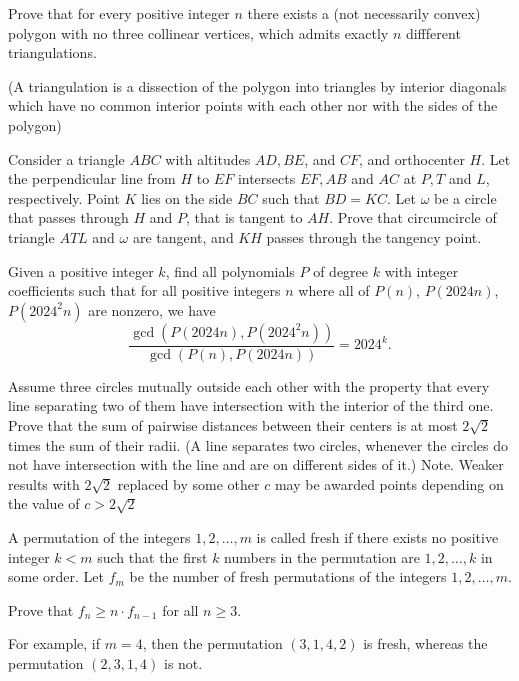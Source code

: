 \documentclass[11pt]{scrartcl}
\begin{document}
\begin{problem}[3706706337726127226]
Prove that for every positive integer $n$ there exists a (not necessarily convex) polygon with no three collinear vertices, which admits exactly $n$ diffferent triangulations.

(A triangulation is a dissection of the polygon into triangles by interior diagonals which have no common interior points with each other nor with the sides of the polygon)
\end{problem}
\begin{problem}[263704170707884]
	Consider a triangle $ABC$ with altitudes $AD, BE$, and $CF$, and orthocenter $H$. Let the perpendicular line from $H$ to $EF$ intersects $EF, AB$ and $AC$ at $P, T$ and $L$, respectively. Point $K$ lies on the side $BC$ such that $BD=KC$. Let $\omega$ be a circle that passes through $H$ and $P$, that is tangent to $AH$. Prove that circumcircle of triangle $ATL$ and $\omega$ are tangent, and $KH$ passes through the tangency point.
\end{problem}
\begin{problem}[291724488494808]
Given a positive integer $k$, find all polynomials $P$ of degree $k$ with integer coefficients such that for all positive integers $n$ where all of $P(n)$, $P(2024n)$, $P(2024^2n)$ are nonzero, we have
$$\frac{\gcd(P(2024n), P(2024^2n))}{\gcd(P(n), P(2024n))}=2024^k.$$
\end{problem}
\begin{problem}[725882523060129]
Assume three circles mutually outside each other with the property that every line separating two of them have intersection with the interior of the third one. Prove that the sum of pairwise distances between their centers is at most $2\sqrt{2}$ times the sum of their radii.
(A line separates two circles, whenever the circles do not have intersection with the line and are on different sides of it.)
Note. Weaker results with $2\sqrt{2}$ replaced by some other $c$ may be awarded points depending on the value of $c>2\sqrt{2}$
\end{problem}
\begin{problem}[742398043567245501]
	A permutation of the integers $1, 2, \ldots, m$ is called fresh if there exists no positive integer $k < m$ such that the first $k$ numbers in the permutation are $1, 2, \ldots, k$ in some order. Let $f_m$ be the number of fresh permutations of the integers $1, 2, \ldots, m$.

Prove that $f_n \ge n \cdot f_{n - 1}$ for all $n \ge 3$.

For example, if $m = 4$, then the permutation $(3, 1, 4, 2)$ is fresh, whereas the permutation $(2, 3, 1, 4)$ is not.
\end{problem}
\end{document}
